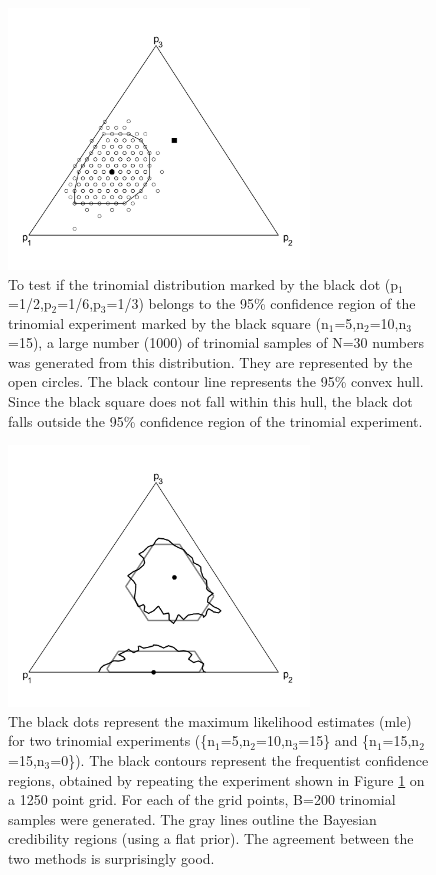 \documentclass{article}
\begin{document}
\begin{figure}[here]
  \centering
  \label{fig:convHull}
  \includegraphics[width=8cm]{4.pdf}
  \caption{
To  test  if  the  trinomial  distribution marked  by  the  black  dot
(p$_1$=1/2,p$_2$=1/6,p$_3$=1/3) belongs to  the 95\% confidence region
of   the   trinomial   experiment   marked   by   the   black   square
(n$_1$=5,n$_2$=10,n$_3$=15),  a  large   number  (1000)  of  trinomial
samples of  N=30 numbers was  generated from this  distribution.  They
are  represented  by  the   open  circles.   The  black  contour  line
represents the 95\% convex hull.  Since the black square does not fall
within  this hull,  the black  dot falls  outside the  95\% confidence
region of the trinomial experiment.}
\end{figure}

\begin{figure}[here]
  \centering
  \label{fig:ternFreqBoot}
  \includegraphics[width=8cm]{5.pdf}
  \caption{
The black  dots represent the  maximum likelihood estimates  (mle) for
two    trinomial   experiments    (\{n$_1$=5,n$_2$=10,n$_3$=15\}   and
\{n$_1$=15,n$_2$=15,n$_3$=0\}).   The  black  contours  represent  the
frequentist confidence  regions, obtained by  repeating the experiment
shown in Figure \ref{fig:convHull} on  a 1250 point grid.  For each of
the  grid points, B=200  trinomial samples  were generated.   The gray
lines outline  the Bayesian credibility regions (using  a flat prior).
The agreement between the two methods is surprisingly good.}
\end{figure}
\end{document}
